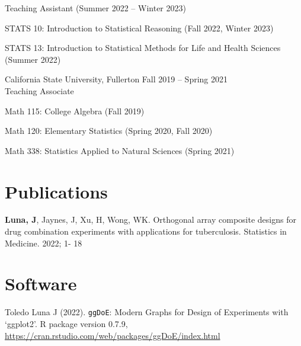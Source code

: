 \documentclass[margin,line]{res}
\newenvironment{list1}{
  \begin{list}{\ding{113}}{
      \setlength{\itemsep}{0in}
      \setlength{\parsep}{0in} \setlength{\parskip}{0in}
      \setlength{\topsep}{0in} \setlength{\partopsep}{0in} 
      \setlength{\leftmargin}{0.20in}}}{\end{list}}
\begin{document}
\begin{resume}
Teaching Assistant (Summer 2022 -- Winter 2023)\\[-0.3cm]
\begin{list1}
	\item[] STATS 10: Introduction to Statistical Reasoning \hspace{1ex} (Fall 2022, Winter 2023)
	\item[] STATS 13: Introduction to Statistical Methods for Life 
and Health Sciences \hspace{1ex} (Summer 2022)
\end{list1}

{\sc California State University, Fullerton} \hfill{Fall 2019 -- Spring 2021} \\ Teaching Associate\\[-0.3cm]
\begin{list1}
	\item[] Math 115: College Algebra \hspace{1ex} (Fall 2019)
	\item[] Math 120: Elementary Statistics  \hspace{1ex} (Spring 2020, Fall 2020)
	\item[] Math 338: Statistics Applied to Natural Sciences  \hspace{1ex} (Spring 2021)
\end{list1}

\vspace{2ex}


\section{\sc Publications}
\begin{list1}
\item[] \textbf{Luna, J}, Jaynes, J, Xu, H, Wong, WK. Orthogonal array composite designs for drug combination experiments with applications for tuberculosis. Statistics in Medicine. 2022; 1- 18
\end{list1}

\vspace{1ex}

\section{\sc Software}
\begin{list1}
\item[] Toledo Luna J (2022). \verb|ggDoE|: Modern Graphs for Design of Experiments
  with `ggplot2'. R package version 0.7.9,
  \url{https://cran.rstudio.com/web/packages/ggDoE/index.html}
\end{list1}




\end{resume}
\end{document}
